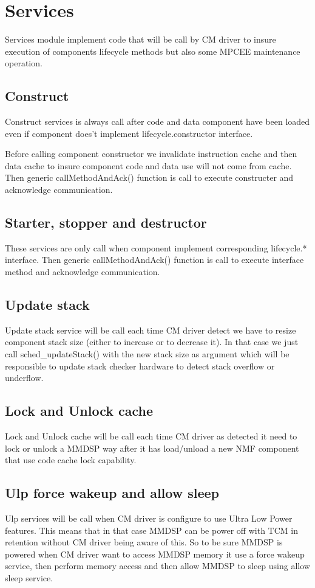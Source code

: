 \chapter{Services}
Services module implement code that will be call by CM driver to insure execution
of components lifecycle methods but also some MPCEE maintenance operation.
\section{Construct}
Construct services is always call after code and data component have been loaded
even if component does't implement lifecycle.constructor interface.

Before calling component constructor we invalidate instruction cache and then
data cache to insure component code and data use will not come from cache. Then
generic callMethodAndAck() function is call to execute constructer and
acknowledge communication.

\section{Starter, stopper and destructor}
These services are only call when component implement corresponding lifecycle.*
interface. Then generic callMethodAndAck() function is call to execute interface
method and acknowledge communication.

\section{Update stack}
Update stack service will be call each time CM driver detect we have to resize
component stack size (either to increase or to decrease it). In that case we
just call sched\_updateStack() with the new stack size as argument which will be
responsible to update stack checker hardware to detect stack overflow or
underflow.

\section{Lock and Unlock cache}
Lock and Unlock cache will be call each time CM driver as detected it need to
lock or unlock a MMDSP way after it has load/unload a new NMF component that
use code cache lock capability.

\section{Ulp force wakeup and allow sleep}
Ulp services will be call when CM driver is configure to use Ultra Low Power
features. This means that in that case MMDSP can be power off with TCM in
retention without CM driver being aware of this. So to be sure MMDSP is powered
when CM driver want to access MMDSP memory it use a force wakeup service, then
perform memory access and then allow MMDSP to sleep using allow sleep service.
